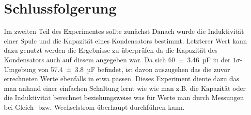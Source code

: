 
\section{Schlussfolgerung}
Im zweiten Teil des Experimentes sollte zunächst %
Danach wurde die Induktivität einer Spule und die Kapazität eines Kondensators bestimmt.
Letzterer Wert kann dazu genutzt werden die Ergebnisse zu überprüfen da die Kapazität des Kondensators auch auf diesem angegeben war.
Da sich \SI{60+-3.46}{µF} in der $1\sigma$-Umgebung von \SI{57.4+-3.8}{µF} befindet, ist davon auszugehen das die zuvor errechneten Werte ebenfalls in etwa passen.
Dieses Experiment diente dazu das man anhand einer einfachen Schaltung lernt wie wie man z.B. die Kapazität oder die Induktivität berechnet beziehungsweise was für Werte man durch Messungen bei Gleich- bzw. Wechselstrom überhaupt durchführen kann.










